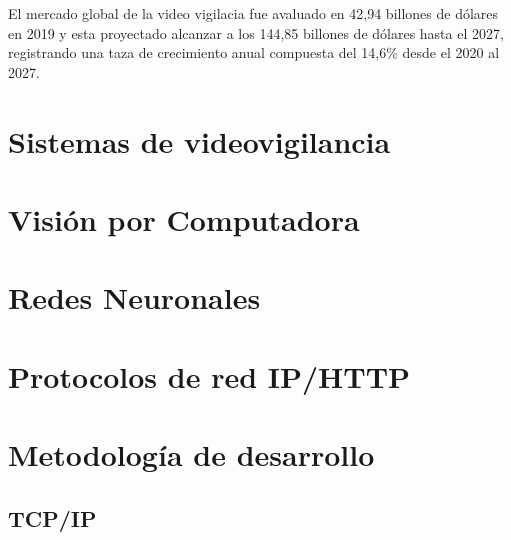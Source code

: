 El mercado global de la video vigilacia fue avaluado en 42,94 billones de dólares en 2019 y esta proyectado alcanzar a los 144,85 billones de dólares hasta el 2027, registrando una taza de crecimiento anual compuesta del 14,6\% desde el 2020 al 2027.\\






\section{Sistemas de videovigilancia}

\section{Visión por Computadora}

\section{Redes Neuronales}

\section{Protocolos de red IP/HTTP}

\section{Metodología de desarrollo}

\subsection{TCP/IP}

